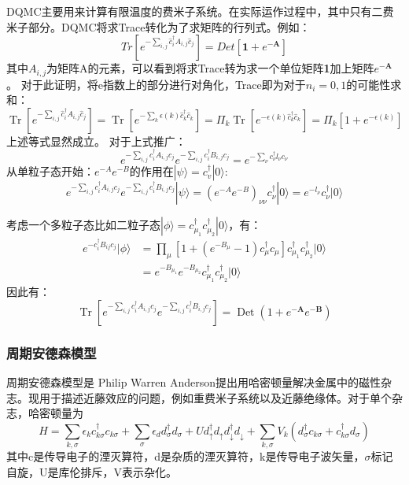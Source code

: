 DQMC主要用来计算有限温度的费米子系统。在实际运作过程中，其中只有二费米子部分。DQMC将求Trace转化为了求矩阵的行列式。例如：
$$Tr[e^{- \sum_{i,j}\widehat{c}^\dagger_i A_{i,j}\widehat{c}_j}]=Det[\textbf{1}+e^{-\textbf{A}}]$$
其中$A_{i,j}$为矩阵A的元素，可以看到将求Trace转为求一个单位矩阵\textbf{1}加上矩阵$e^{-\textbf{A}}$。
对于此证明，将e指数上的部分进行对角化，Trace即为对于$n_i=0,1$的可能性求和：
$$
\operatorname{Tr}\left[e^{-\sum_{i, j} \hat{c}_{i}^{\dagger} A_{i, j} \hat{c}_{j}}\right]=\operatorname{Tr}\left[e^{-\sum_{k} \epsilon(k) \hat{c}_{k}^{\dagger} \hat{c}_{k}}\right]=\Pi_{k} \operatorname{Tr}\left[e^{-\epsilon(k) \hat{c}_{k}^{\dagger} \hat{c}_{k}}\right]=\Pi_{k}\left[1+e^{-\epsilon(k)}\right]
$$
上述等式显然成立。
对于上式推广：
$$
e^{-\sum_{i, j} c_{i}^{\dagger} A_{i, j} c_{j}} e^{-\sum_{i, j} c_{i}^{\dagger} B_{i, j} c_{j}}=e^{-\sum_{\nu} c_{\nu}^{\dagger} l_{\nu} c_{\nu}}
$$
从单粒子态开始：$e^{-A}e^{-B}$的作用在$|\psi \rangle=c^{\dagger}_v|0\rangle$:
$$
e^{-\sum_{i, j} c_{i}^{\dagger} A_{i, j} c_{j}} e^{-\sum_{i, j} c_{i}^{\dagger} B_{i, j} c_{j}}|\psi\rangle=\left(e^{-A} e^{-B}\right)_{\nu \nu} c_{\nu}^{\dagger}|0\rangle=e^{-l_{\nu}} c_{\nu}^{\dagger}|0\rangle
$$

考虑一个多粒子态比如二粒子态$|\phi\rangle=c^\dagger _{\mu_1}c^\dagger _{\mu_2}|0\rangle$，有：
$$
\begin{aligned}
e^{-c_{i}^{\dagger} B_{i j} c_{j}}|\phi\rangle &=\prod_{\mu}\left[1+\left(e^{-B_{\mu}}-1\right) c_{\mu}^{\dagger} c_{\mu}\right] c_{\mu_{1}}^{\dagger} c_{\mu_{2}}^{\dagger}|0\rangle \\
&=e^{-B_{\mu_{1}}} e^{-B_{\mu_{2}}} c_{\mu_{1}}^{\dagger} c_{\mu_{2}}^{\dagger}|0\rangle
\end{aligned}
$$
因此有：
$$
\operatorname{Tr}\left[e^{-\sum_{i, j} c_{i}^{\dagger} A_{i, j} c_{j}} e^{-\sum_{i, j} c_{i}^{\dagger} B_{i, j} c_{j}}\right]=\operatorname{Det}\left(1+e^{-\mathbf{A}} e^{-\mathbf{B}}\right)
$$





\subsubsection{周期安德森模型}
周期安德森模型是 Philip Warren Anderson提出用哈密顿量解决金属中的磁性杂志。现用于描述近藤效应的问题，例如重费米子系统以及近藤绝缘体。对于单个杂志，哈密顿量为
$$
H=\sum_{k, \sigma} \epsilon_{k} c_{k \sigma}^{\dagger} c_{k \sigma}+\sum_{\sigma} \epsilon_{d} d_{\sigma}^{\dagger} d_{\sigma}+U d_{\uparrow}^{\dagger} d_{\uparrow} d_{\downarrow}^{\dagger} d_{\downarrow}+\sum_{k, \sigma} V_{k}\left(d_{\sigma}^{\dagger} c_{k \sigma}+c_{k \sigma}^{\dagger} d_{\sigma}\right)
$$
其中c是传导电子的湮灭算符，d是杂质的湮灭算符，k是传导电子波矢量，$\sigma$标记自旋，U是库伦排斥，V表示杂化。

